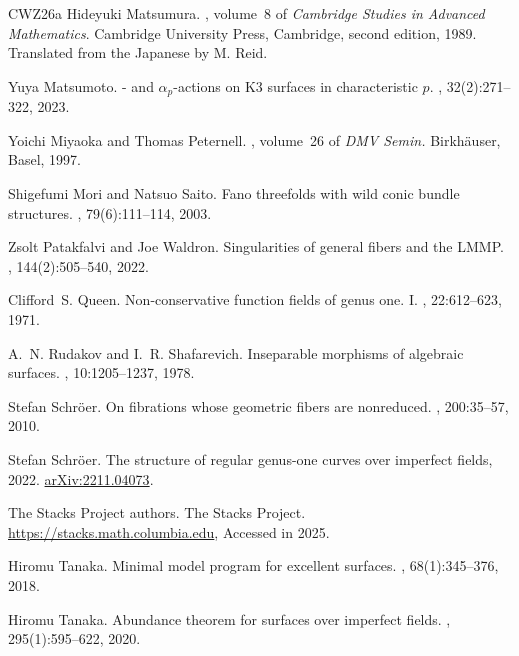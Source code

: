 \documentclass[reqno,oneside]{amsart}
\theoremstyle{definition}
\theoremstyle{plain}
\numberwithin{equation}{section}
\begin{document}
\begin{thebibliography}{CWZ26a}
Hideyuki Matsumura.
, volume~8 of {\em Cambridge Studies in Advanced Mathematics}.
\newblock Cambridge University Press, Cambridge, second edition, 1989.
\newblock Translated from the Japanese by M. Reid.

Yuya Matsumoto.
- and {$\alpha_p$}-actions on {K}3 surfaces in characteristic {$p$}.
, 32(2):271--322, 2023.

Yoichi Miyaoka and Thomas Peternell.
, volume~26 of {\em DMV Semin.}
\newblock Birkh\"auser, Basel, 1997.

Shigefumi Mori and Natsuo Saito.
\newblock Fano threefolds with wild conic bundle structures.
, 79(6):111--114, 2003.

Zsolt Patakfalvi and Joe Waldron.
\newblock Singularities of general fibers and the {LMMP}.
, 144(2):505--540, 2022.

Clifford~S. Queen.
\newblock Non-conservative function fields of genus one. {I}.
, 22:612--623, 1971.

A.~N. Rudakov and I.~R. Shafarevich.
\newblock Inseparable morphisms of algebraic surfaces.
, 10:1205--1237, 1978.

Stefan Schr\"oer.
\newblock On fibrations whose geometric fibers are nonreduced.
, 200:35--57, 2010.

Stefan Schröer.
\newblock The structure of regular genus-one curves over imperfect fields, 2022.
\newblock \href{https://arxiv.org/abs/2211.04073}{arXiv:2211.04073}.

The {Stacks {P}roject authors}.
\newblock The {S}tacks {P}roject.
\newblock \url{https://stacks.math.columbia.edu}, Accessed in 2025.

Hiromu Tanaka.
\newblock Minimal model program for excellent surfaces.
, 68(1):345--376, 2018.

Hiromu Tanaka.
\newblock Abundance theorem for surfaces over imperfect fields.
, 295(1):595--622, 2020.


\end{thebibliography}
\end{document}
